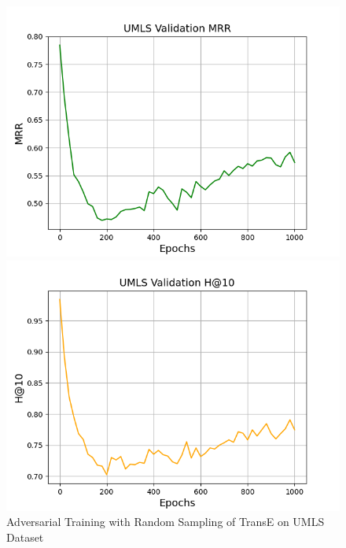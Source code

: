 \begin{figure}
\begin{minipage}{.5\textwidth}
    \end{minipage}
    \begin{minipage}{.5\textwidth}
      \centering
      \includegraphics[width=0.9\linewidth]{figures/results/UMLS/AdversarialTraining/Random/gan_train_umls_mrr.png}
    \end{minipage}%
    \begin{minipage}{.5\textwidth}
      \centering
      \includegraphics[width=0.9\linewidth]{figures/results/UMLS/AdversarialTraining/Random/gan_train_umls_hit10.png}
    \end{minipage}%
    \caption{Adversarial Training with Random Sampling of TransE on UMLS Dataset}
    \label{fig:test}
\end{figure}

\pagebreak

